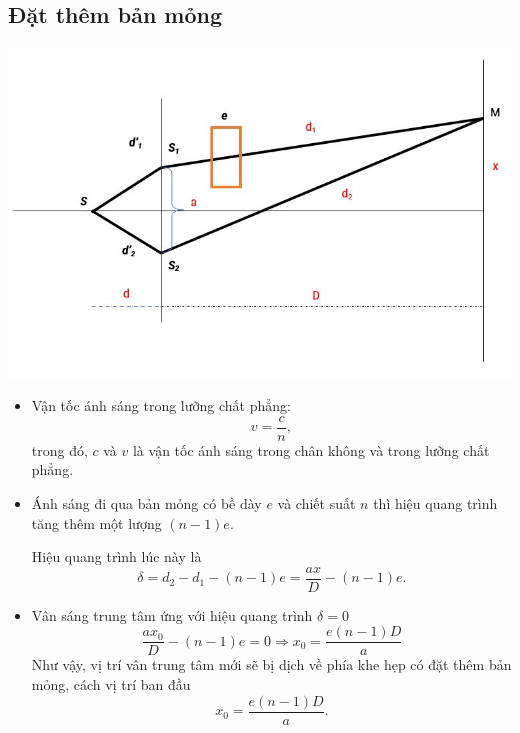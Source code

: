 \subsection{Đặt thêm bản mỏng}
\begin{center}
	\includegraphics[scale=0.7]{../figs/VN12-PH-33-A-017-4-2.JPG}
\end{center}
\begin{itemize}
	\item Vận tốc ánh sáng trong lưỡng chất phẳng: 
	\begin{equation}
	v=\dfrac{c}{n},
	\end{equation}
	trong đó, $c$ và $v$  là vận tốc ánh sáng trong chân không và trong lưỡng chất phẳng.
	\item Ánh sáng đi qua bản mỏng có bề dày $e$ và chiết suất $n$ thì hiệu quang trình tăng thêm một lượng $(n-1)e$.
	
	Hiệu quang trình lúc này là
	\begin{equation}
	\delta = d_2-d_1-(n-1)e= \dfrac{ax}{D}-(n-1)e. 
	\end{equation}
	\item Vân sáng trung tâm ứng với hiệu quang trình $\delta =0$
	\begin{equation*}
	\dfrac{ax_0}{D}-(n-1)e=0 \Rightarrow x_0=\dfrac {e(n-1)D}{a}
	\end{equation*}
	Như vậy, vị trí vân trung tâm mới sẽ bị dịch về phía khe hẹp có đặt thêm bản mỏng, cách vị trí  ban đầu 
	\begin{equation}
		x_0=\dfrac {e(n-1)D}{a}.
	\end{equation}
\end{itemize}

